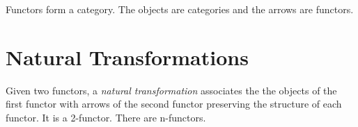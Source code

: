 Functors form a category. The objects are categories and the arrows
are functors.

\section{Natural Transformations}
Given two functors, a {\em natural transformation} associates the
the objects of the first functor with arrows of the second functor
preserving the structure of each functor. It is a 2-functor. There
are n-functors.
